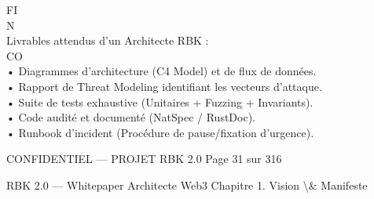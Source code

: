\documentclass[12pt,landscape,a4paper]{article}
\newenvironment{confidential}
{\begin{tcolorbox}[
    colback=rbkred!5!white,
    colframe=rbkred!75!black,
    title=CONFIDENTIEL,
    fonttitle=\bfseries\color{white},
    coltitle=rbkred!75!black,
    breakable,
    enhanced,
    frame hidden,
    borderline west={2pt}{0pt}{rbkred!75!black}
]}
{\end{tcolorbox}}
\begin{document}
\vspace{0.5em}
FI\\
N\\
Livrables attendus d’un Architecte RBK :\\
CO\\
• Diagrammes d’architecture (C4 Model) et de flux de données.\\
\vspace{0.5em}
• Rapport de Threat Modeling identifiant les vecteurs d’attaque.\\
\vspace{0.5em}
• Suite de tests exhaustive (Unitaires + Fuzzing + Invariants).\\
\vspace{0.5em}
• Code audité et documenté (NatSpec / RustDoc).\\
\vspace{0.5em}
• Runbook d’incident (Procédure de pause/fixation d’urgence).\\
\vspace{0.5em}
\vspace{0.5em}
\vspace{0.5em}
\vspace{0.5em}
\begin{confidential}CONFIDENTIEL — PROJET RBK 2.0                                Page 31 sur 316\end{confidential}
RBK 2.0 — Whitepaper Architecte Web3                                                                                        Chapitre 1. Vision \textbackslash{}& Manifeste\\
\vspace{0.5em}
\vspace{0.5em}
\end{document}
